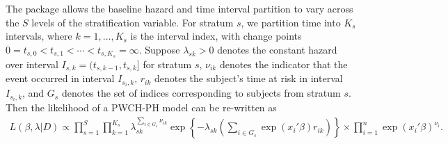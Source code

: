 The package allows the baseline hazard and time interval partition to vary across the $S$ levels of the stratification variable. For stratum $s$, we partition time into $K_s$ intervals, where $k=1,\dots,K_s$ is the interval index, with change points $0=t_{s,0} < t_{s,1} < \cdots < t_{s,K_s} = \infty$. Suppose $\lambda_{sk} > 0$ denotes the constant hazard over interval $I_{s,k}=(t_{s,k-1}, t_{s,k}]$ for stratum $s$, $\nu_{ik}$ denotes the indicator that the event occurred in interval $I_{s_i,k}$, $r_{ik}$ denotes the subject's time at risk in interval $I_{s_i,k}$, and $G_s$ denotes the set of indices corresponding to subjects from stratum $s$. 
Then the likelihood of a PWCH-PH model can be re-written as
\begin{align}\label{likelihood}
L(\beta,\lambda|D)\propto\prod_{s=1}^S\prod_{k=1}^{K_s}\lambda_{sk}^{\sum\limits_{i\in G_s}\nu_{ik}}\exp\left\{-\lambda_{sk}\left(\sum_{i\in G_s}\exp(x_i'\beta)r_{ik}\right)\right\}\times \prod_{i=1}^n\exp(x_i'\beta)^{\nu_i}.
\end{align}

